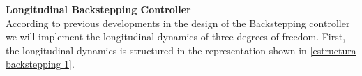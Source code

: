 %
%
%
%
%
%
%
%

\bigskip

\textbf{Longitudinal Backstepping Controller}\\
According to previous developments in the design of the Backstepping controller we will implement the longitudinal dynamics of three degrees of freedom. First, the longitudinal dynamics is structured in the representation shown in \ref{estructura backstepping 1}. 

